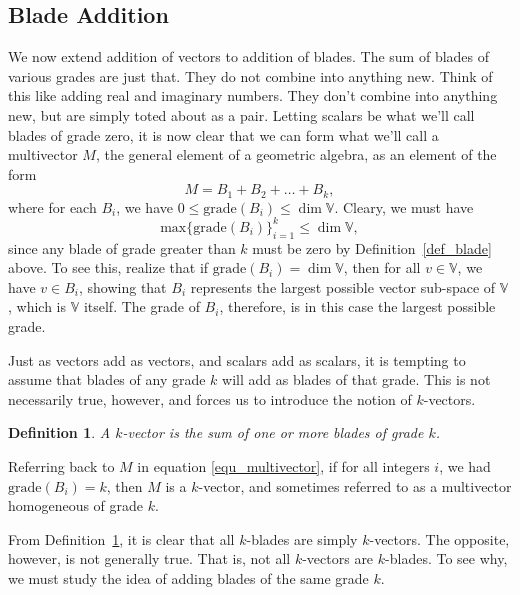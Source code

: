 \documentclass[12pt]{article}
\numberwithin{equation}{section}
\newcommand{\V}{\mathbb{V}}
\newtheorem{definition}{Definition}[section]
\begin{document}
\subsection{Blade Addition}

We now extend addition of vectors to addition of blades.  The sum of blades
of various grades are just that.  They do not combine into anything new.
Think of this like adding real and imaginary numbers.  They don't combine
into anything new, but are simply toted about as a pair.  Letting scalars
be what we'll call blades of grade zero, it is now clear that we can form
what we'll call a multivector $M$, the general element of a geometric algebra,
as an element of the form
\begin{equation}\label{equ_multivector}
M = B_1 + B_2 + \dots + B_k,
\end{equation}
where for each $B_i$, we have $0\leq\mbox{grade}(B_i)\leq\dim\V$.
Cleary, we must have
\begin{equation}
\mbox{max}\{\mbox{grade}(B_i)\}_{i=1}^k\leq\dim\V,
\end{equation}
since any blade of grade greater than $k$ must be zero by Definition~\ref{def_blade} above.
To see this, realize that if $\mbox{grade}(B_i)=\dim\V$, then for all $v\in\V$, we have $v\in B_i$,
showing that $B_i$ represents the largest possible vector sub-space of $\V$, which is $\V$ itself.  The
grade of $B_i$, therefore, is in this case the largest possible grade.

Just as vectors add as vectors, and scalars add as scalars, it is tempting to assume
that blades of any grade $k$ will add as blades of that grade.  This is not necessarily true, however,
and forces us to introduce the notion of $k$-vectors.
\begin{definition}\label{def_k_vector}
A $k$-vector is the sum of one or more blades of grade $k$.
\end{definition}
Referring back to $M$ in equation \eqref{equ_multivector}, if for all integers $i$, we had
$\mbox{grade}(B_i)=k$, then $M$ is a $k$-vector, and sometimes referred
to as a multivector homogeneous of grade $k$.

From Definition~\ref{def_k_vector}, it is clear that all $k$-blades are simply
$k$-vectors.  The opposite, however, is not generally true.
That is, not all $k$-vectors are
$k$-blades.  To see why, we must study the idea of adding blades of the
same grade $k$.
\end{document}
